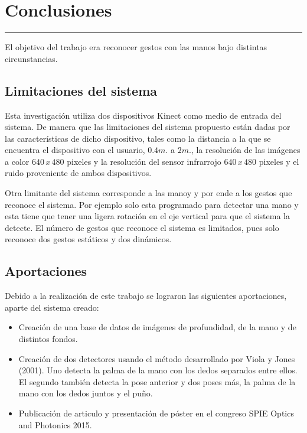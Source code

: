 \chapter{Conclusiones}\label{capit:cap6}
\vspace{-2.0325ex}%
\noindent
\rule{\textwidth}{0.5pt}
\vspace{-5.5ex}%
\newcommand{\pushline}{\Indp}%

El objetivo del trabajo era reconocer gestos con las manos bajo distintas circunstancias. 


\section{Limitaciones del sistema}

Esta investigación utiliza dos dispositivos Kinect como medio de entrada del sistema. De  manera que las limitaciones del sistema propuesto están dadas por las características de dicho dispositivo, tales como la distancia a la que se encuentra el dispositivo con el usuario, $0.4m.$ a $2m.$, la resolución de las imágenes a color $640 \, x \, 480$ pixeles y la resolución del sensor infrarrojo $640 \, x \, 480$ pixeles y el ruido proveniente de ambos dispositivos.

Otra limitante del sistema corresponde a las manoy y por ende a los gestos que reconoce el sistema. Por ejemplo solo esta programado para detectar una mano y esta tiene que tener una ligera rotación en el eje vertical para que el sistema la detecte. El número de gestos que reconoce el sistema es limitados, pues solo reconoce dos gestos estáticos y dos dinámicos. 


\section{Aportaciones}  

Debido a la realización de este trabajo se lograron las siguientes aportaciones, aparte del sistema creado: 
 
\begin{itemize}
\item Creación de una base de datos de imágenes de profundidad, de la mano y de distintos fondos.   

\item Creación de dos detectores usando el método desarrollado por Viola y Jones (2001). Uno detecta la palma de la mano con los dedos separados entre ellos. El segundo también detecta la pose anterior y dos poses más, la palma de la mano con los dedos juntos y el puño. 

\item Publicación de articulo y presentación de póster en el congreso SPIE Optics and Photonics 2015.     

\end{itemize}


